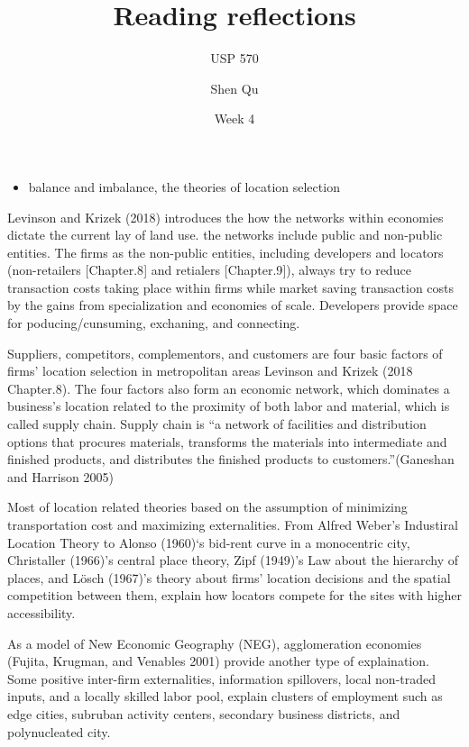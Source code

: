 \documentclass[12pt,]{article}
\title{Reading reflections}
\subtitle{USP 570}
\author{Shen Qu}
\date{Week 4}
\providecommand{\tightlist}{%
  \setlength{\itemsep}{0pt}\setlength{\parskip}{0pt}}
\begin{document}
\maketitle

\begin{itemize}
\tightlist
\item
  balance and imbalance, the theories of location selection
\end{itemize}

Levinson and Krizek (2018) introduces the how the networks within
economies dictate the current lay of land use. the networks include
public and non-public entities. The firms as the non-public entities,
including developers and locators (non-retailers {[}Chapter.8{]} and
retialers {[}Chapter.9{]}), always try to reduce transaction costs
taking place within firms while market saving transaction costs by the
gains from specialization and economies of scale. Developers provide
space for poducing/cunsuming, exchaning, and connecting.

Suppliers, competitors, complementors, and customers are four basic
factors of firms' location selection in metropolitan areas Levinson and
Krizek (2018 Chapter.8). The four factors also form an economic network,
which dominates a business's location related to the proximity of both
labor and material, which is called supply chain. Supply chain is ``a
network of facilities and distribution options that procures materials,
transforms the materials into intermediate and finished products, and
distributes the finished products to customers.''(Ganeshan and Harrison
2005)

Most of location related theories based on the assumption of minimizing
transportation cost and maximizing externalities. From Alfred Weber's
Industiral Location Theory to Alonso (1960)`s bid-rent curve in a
monocentric city, Christaller (1966)'s central place theory, Zipf
(1949)'s Law about the hierarchy of places, and Lösch (1967)'s theory
about firms' location decisions and the spatial competition between
them, explain how locators compete for the sites with higher
accessibility.

As a model of New Economic Geography (NEG), agglomeration economies
(Fujita, Krugman, and Venables 2001) provide another type of
explaination. Some positive inter-firm externalities, information
spillovers, local non-traded inputs, and a locally skilled labor pool,
explain clusters of employment such as edge cities, subruban activity
centers, secondary business districts, and polynucleated city.
\end{document}
